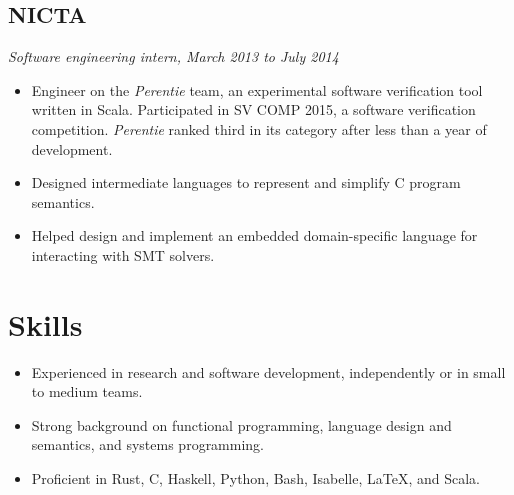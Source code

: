 \documentclass{article}
\begin{document}
\begin{multicols*}{2}
\subsection*{NICTA}
\textit{Software engineering intern, March 2013 to July 2014}

\begin{itemize}[leftmargin=12pt, itemsep=-2pt, topsep=-4pt]
 \item {
  Engineer on the \textit{Perentie} team, an experimental software verification tool written in Scala. Participated in SV COMP 2015, a software verification competition. \textit{Perentie} ranked third in its category after less than a year of development.
 }
 \item {
  Designed intermediate languages to represent and simplify C program semantics.
 }
 \item {
  Helped design and implement an embedded domain-specific language for interacting with SMT solvers.
 }
\end{itemize}

\section*{Skills}

\begin{itemize}[leftmargin=12pt, itemsep=-2pt, topsep=-4pt]
 \item {
  Experienced in research and software development, independently or in small to medium teams.
 }
 \item {
  Strong background on functional programming, language design and semantics, and systems programming.
 }
 \item {
  Proficient in Rust, C, Haskell, Python, Bash, Isabelle, \LaTeX, and Scala.
 }
\end{itemize}

\nocite{*}
\printbibliography[title=Publications]

\vfill

\end{multicols*}
\end{document}
